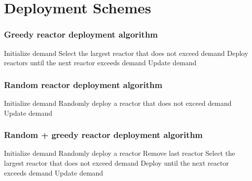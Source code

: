\documentclass[9pt]{beamer}
\begin{document}
  \section{Deployment Schemes}
  \begin{frame}
    \frametitle{Greedy reactor deployment algorithm}
      \begin{algorithmic}[1]
          \State Initialize demand
              \State Select the largest reactor that does not exceed demand
              \State Deploy reactors until the next reactor exceeds demand
              \State Update demand
          \EndWhile
      \end{algorithmic}
  \end{frame}

  \begin{frame}
    \frametitle{Random reactor deployment algorithm}
      \begin{algorithmic}[1]
          \State Initialize demand
              \State Randomly deploy a reactor that does not exceed demand
              \State Update demand
          \EndWhile
      \end{algorithmic}
  \end{frame}

  \begin{frame}
    \frametitle{Random + greedy reactor deployment algorithm}
        \begin{algorithmic}[1]
            \State Initialize demand
                \State Randomly deploy a reactor
                    \State Remove last reactor
                        \State Select the largest reactor that does not exceed demand
                        \State Deploy until the next reactor exceeds demand
                        \State Update demand
                    \EndIf
                \EndIf
            \EndWhile
        \end{algorithmic}
  \end{frame}
\end{document}
